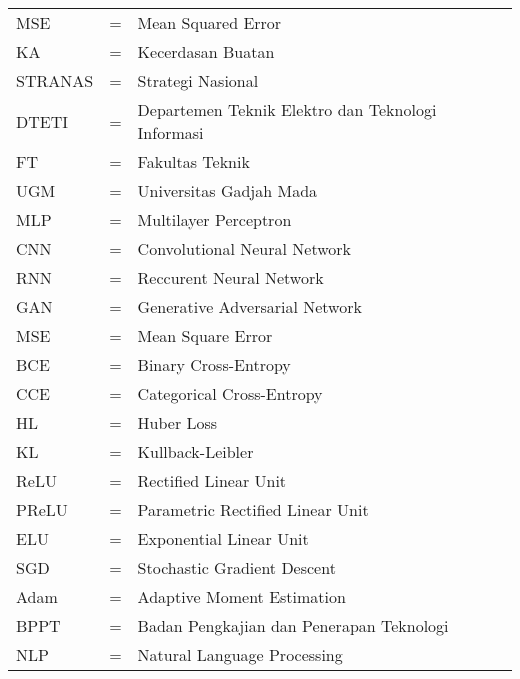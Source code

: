 \begin{tabular}{llp{3in}}
		MSE	&  \hspace{1.5cm} = & Mean Squared Error\\
        KA	&  \hspace{1.5cm} = & Kecerdasan Buatan\\
        STRANAS & \hspace{1.5cm} = & Strategi Nasional\\
		DTETI & \hspace{1.5cm} = & Departemen Teknik Elektro dan Teknologi
		Informasi\\
		FT & \hspace{1.5cm} = & Fakultas Teknik\\
		UGM & \hspace{1.5cm} = & Universitas Gadjah Mada\\
		MLP & \hspace{1.5cm} = & Multilayer Perceptron\\
		CNN & \hspace{1.5cm} = & Convolutional Neural Network\\
		RNN & \hspace{1.5cm} = & Reccurent Neural Network\\
		GAN & \hspace{1.5cm} = & Generative Adversarial Network\\
		MSE & \hspace{1.5cm} = & Mean Square Error\\
		BCE & \hspace{1.5cm} = & Binary Cross-Entropy\\
		CCE & \hspace{1.5cm} = & Categorical Cross-Entropy\\
		HL & \hspace{1.5cm} = & Huber Loss\\
		KL & \hspace{1.5cm} = & Kullback-Leibler\\
		ReLU & \hspace{1.5cm} = & Rectified Linear Unit\\
		PReLU & \hspace{1.5cm} = & Parametric Rectified Linear Unit\\
		ELU & \hspace{1.5cm} = & Exponential Linear Unit\\
		SGD & \hspace{1.5cm} = & Stochastic Gradient Descent\\
		Adam & \hspace{1.5cm} = & Adaptive Moment Estimation\\
		BPPT & \hspace{1.5cm} = & Badan Pengkajian dan Penerapan Teknologi\\
		NLP & \hspace{1.5cm} = & Natural Language Processing\\
		
\end{tabular}